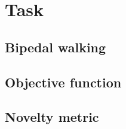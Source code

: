 \section{Task}
\subsection{Bipedal walking}
\subsection{Objective function}
\subsection{Novelty metric}
